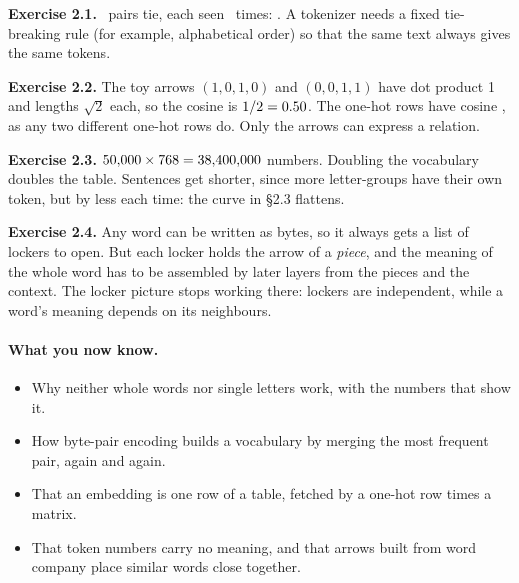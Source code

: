 \noindent\textbf{Exercise 2.1.} \nTwoExTies\ pairs tie, each seen \nTwoExTopCount\ times: \nTwoExTiePairs.
A tokenizer needs a fixed tie-breaking rule (for example, alphabetical order) so that the same text always
gives the same tokens.

\noindent\textbf{Exercise 2.2.} The toy arrows $(1,0,1,0)$ and $(0,0,1,1)$ have dot product 1 and lengths
$\sqrt2$ each, so the cosine is $1/2 = 0.50$. The one-hot rows have cosine \nTwoOneHotCos,
as any two different one-hot rows do. Only the arrows can express a relation.

\noindent\textbf{Exercise 2.3.} $50{,}000\times768 = 38{,}400{,}000$ numbers. Doubling the vocabulary doubles
the table. Sentences get shorter, since more letter-groups have their own token, but by less each time:
the curve in \S2.3 flattens.

\noindent\textbf{Exercise 2.4.} Any word can be written as bytes, so it always gets a list of lockers to
open. But each locker holds the arrow of a \emph{piece}, and the meaning of the whole word has to be
assembled by later layers from the pieces and the context. The locker picture stops working there:
lockers are independent, while a word's meaning depends on its neighbours.

\paragraph{What you now know.}
\begin{itemize}
\item Why neither whole words nor single letters work, with the numbers that show it.
\item How byte-pair encoding builds a vocabulary by merging the most frequent pair, again and again.
\item That an embedding is one row of a table, fetched by a one-hot row times a matrix.
\item That token numbers carry no meaning, and that arrows built from word company place similar words
close together.
\end{itemize}

